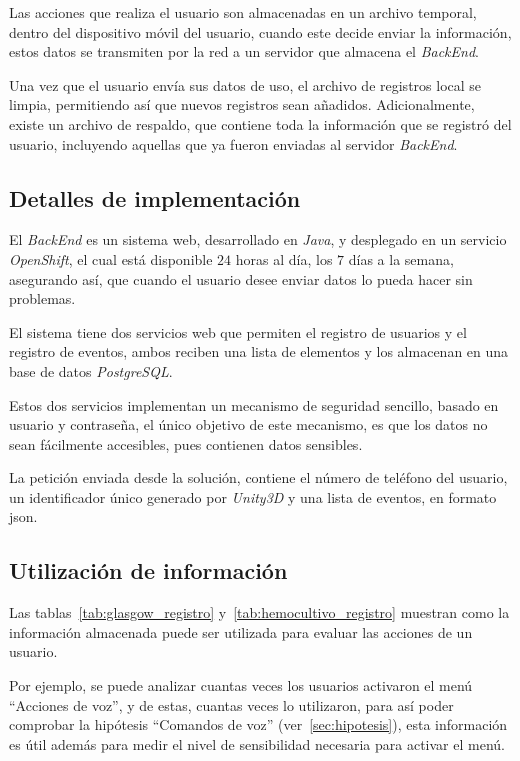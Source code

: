 Las acciones que realiza el usuario son almacenadas en un archivo temporal,
dentro del dispositivo móvil del usuario, cuando este decide enviar la
información, estos datos se transmiten por la red a un servidor que almacena el
\textit{BackEnd}.

Una vez que el usuario envía sus datos de uso, el archivo de registros
local se limpia, permitiendo así que nuevos registros sean añadidos.
Adicionalmente, existe un archivo de respaldo, que contiene toda la información
que se registró del usuario, incluyendo aquellas que ya fueron enviadas al
servidor \textit{BackEnd}.

\subsection{Detalles de implementación}

El \textit{BackEnd} es un sistema web, desarrollado en \textit{Java}, y
desplegado en un servicio \textit{OpenShift}, el cual está disponible $24$ horas
al día, los $7$ días a la semana, asegurando así, que cuando el usuario desee
enviar datos lo pueda hacer sin problemas.

El sistema tiene dos servicios web que permiten el registro de usuarios y el
registro de eventos, ambos reciben una lista de elementos y los almacenan en una
base de datos \textit{PostgreSQL}.

Estos dos servicios implementan un mecanismo de seguridad sencillo, basado en usuario y
contraseña, el único objetivo de este mecanismo, es que los datos no sean
fácilmente accesibles, pues contienen datos sensibles.

La petición enviada desde la solución, contiene el número de teléfono del
usuario, un identificador único generado por \textit{Unity3D} y una lista de
eventos, en formato \Gls{json}.

\subsection{Utilización de información}

Las tablas~\ref{tab:glasgow_registro} y~\ref{tab:hemocultivo_registro} muestran
como la información almacenada puede ser utilizada para evaluar las acciones de
un usuario.

Por ejemplo, se puede analizar cuantas veces los usuarios activaron el menú
\enquote{Acciones de voz}, y de estas, cuantas veces lo utilizaron, para así
poder comprobar la hipótesis \enquote{Comandos de voz}
(ver~\ref{sec:hipotesis}), esta información es útil además para medir el
nivel de sensibilidad necesaria para activar el menú.

